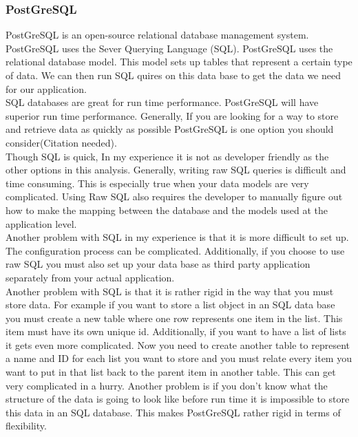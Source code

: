 \documentclass[letterpaper,10pt]{article}
\begin{document}
		\subsubsection{PostGreSQL}
				PostGreSQL is an open-source relational database management system. PostGreSQL uses the Sever Querying Language (SQL). PostGreSQL uses the relational database model. This model sets up tables that represent a certain type of data. We can then run SQL quires on this data base to get the data we need for our application.\\
				SQL databases are great for run time performance. PostGreSQL will have superior run time performance. Generally, If you are looking for a way to store and retrieve data as quickly as possible PostGreSQL is one option you should consider(Citation needed).\\
				Though SQL is quick, In my experience it is not as developer friendly as the other options in this analysis. Generally, writing raw SQL queries is difficult and time consuming. This is especially true when your data models are very complicated. Using Raw SQL also requires the developer to manually figure out how to make the mapping between the database and the models used at the application level.\\
				Another problem with SQL in my experience is that it is more difficult to set up. The configuration process can be complicated. Additionally, if you choose to use raw SQL you must also set up your data base as third party application separately from your actual application.\\
				Another problem with SQL is that it is rather rigid in the way that you must store data. For example if you want to store a list object in an SQL data base you must create a new table where one row represents one item in the list. This item must have its own unique id. Additionally, if you want to have a list of lists it gets even more complicated. Now you need to create another table to represent a name and ID for each list you want to store and you must relate every item you want to put in that list back to the parent item in another table. This can get very complicated in a hurry. Another problem is if you don't know what the structure of the data is going to look like before run time it is impossible to store this data in an SQL database. This makes PostGreSQL rather rigid in terms of flexibility.
\end{document}

